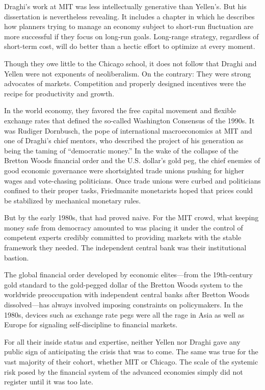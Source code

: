 \documentclass[
]{book}
\begin{document}
Draghi's work at MIT was less intellectually generative than Yellen's. But his dissertation is nevertheless revealing. It includes a chapter in which he describes how planners trying to manage an economy subject to short-run fluctuation are more successful if they focus on long-run goals. Long-range strategy, regardless of short-term cost, will do better than a hectic effort to optimize at every moment.

Though they owe little to the Chicago school, it does not follow that Draghi and Yellen were not exponents of neoliberalism. On the contrary: They were strong advocates of markets.
Competition and properly designed incentives were the recipe for productivity and growth.

In the world economy, they favored the free capital movement and flexible exchange rates that defined the so-called Washington Consensus of the 1990s. It was Rudiger Dornbusch, the pope of international macroeconomics at MIT and one of Draghi's chief mentors, who described the project of his generation as being the taming of ``democratic money.'' In the wake of the collapse of the Bretton Woods financial order and the U.S. dollar's gold peg, the chief enemies of good economic governance were shortsighted trade unions pushing for higher wages and vote-chasing politicians. Once trade unions were curbed and politicians confined to their proper tasks, Friedmanite monetarists hoped that prices could be stabilized by mechanical monetary rules.

But by the early 1980s, that had proved naive. For the MIT crowd, what keeping money safe from democracy amounted to was placing it under the control of competent experts credibly committed to providing markets with the stable framework they needed. The independent central bank was their institutional bastion.

The global financial order developed by economic elites---from the 19th-century gold standard to the gold-pegged dollar of the Bretton Woods system to the worldwide preoccupation with independent central banks after Bretton Woods dissolved---has always involved imposing constraints on policymakers. In the 1980s, devices such as exchange rate pegs were all the rage in Asia as well as Europe for signaling self-discipline to financial markets.

For all their inside status and expertise, neither Yellen nor Draghi gave any public sign of anticipating the crisis that was to come. The same was true for the vast majority of their cohort, whether MIT or Chicago. The scale of the systemic risk posed by the financial system of the advanced economies simply did not register until it was too late.
\end{document}
